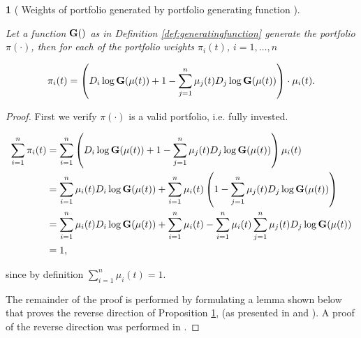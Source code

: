 \documentclass[british]{amsart} \usepackage{lmodern}
\numberwithin{equation}{section} \numberwithin{figure}{section}
\theoremstyle{plain} \newtheorem{thm}{\protect\theoremname}[section]
\theoremstyle{definition} \newtheorem{defn}[thm]{\protect\definitionname}
\theoremstyle{plain} \newtheorem{assumption}[thm]{\protect\assumptionname}
\theoremstyle{plain} \newtheorem{lem}[thm]{\protect\lemmaname}
\theoremstyle{plain} \newtheorem{prop}[thm]{\protect\propositionname}
\theoremstyle{remark} \newtheorem{rem}[thm]{\protect\remarkname}
\theoremstyle{plain} \newtheorem{cor}[thm]{\protect\corollaryname}
\newcommand{\rangei}{i=1,\dots,n} \newcommand{\measure}{\mathbb{P}}
\begin{document}
\begin{prop} [
  {\cite[Proposition 2.3.2]{vervuurt2015}}
  Weights of portfolio generated by portfolio generating function
  ]
  \label{prop:generatingfunction}

  Let a function $\mathbf{G}()$ as in Definition \ref{def:generatingfunction}
  generate the portfolio $\pi(\cdot)$, then for each of the portfolio weights
  $\pi_{i}(t)$, $\rangei$

  \begin{equation}
    \label{eq:portfoliogeneratedbyG}
    \pi_{i}(t) = 
      \left( 
        D_{i}\log{\mathbf{G}(\mu(t))} + 1 - 
          \sum_{j=1}^{n} \mu_{j}(t) D_{j} \log{\mathbf{G}(\mu(t))}
      \right) \cdot \mu_{i}(t).
  \end{equation}

\end{prop}

\begin{proof}
  First we verify $\pi(\cdot)$ is a valid portfolio, i.e. fully invested.

   \begin{gather}
    \begin{split}
      \sum_{i=1}^{n} \pi_{i}(t) 
      &= \sum_{i=1}^{n} 
        \left( 
          D_{i}\log{\mathbf{G}(\mu(t))} + 1 - 
            \sum_{j=1}^{n} \mu_{j}(t)D_{j}\log{\mathbf{G}(\mu(t))}
        \right) \mu_{i}(t) \\
      &= 
        \sum_{i=1}^{n} \mu_{i}(t) D_{i}\log{\mathbf{G}(\mu(t))} + 
        \sum_{i=1}^{n} \mu_{i}(t)
        \left( 
          1 - \sum_{j=1}^{n} \mu_{j}(t)D_{j}\log{\mathbf{G}(\mu(t))}
        \right) \\
       &= 
        \sum_{i=1}^{n} \mu_{i}(t) D_{i}\log{\mathbf{G}(\mu(t))} + 
        \sum_{i=1}^{n} \mu_{i}(t) -
        \sum_{i=1}^{n} \mu_{i}(t) \sum_{j=1}^{n} \mu_{j}(t)D_{j}\log{\mathbf{G}(\mu(t))} \\
       &= 1,
    \end{split}
  \end{gather}

  since by definition $\sum_{i=1}^{n} \mu_{i}(t) = 1$.

  The remainder of the proof is performed by formulating a lemma shown below that
  proves the reverse direction of Proposition \ref{prop:generatingfunction}, (as
  presented in \cite{fernholz2009} and \cite{vervuurt2015}). A proof of the
  reverse direction was performed in \cite{fernholz1999pgf}. 

\end{proof}

\end{document}
